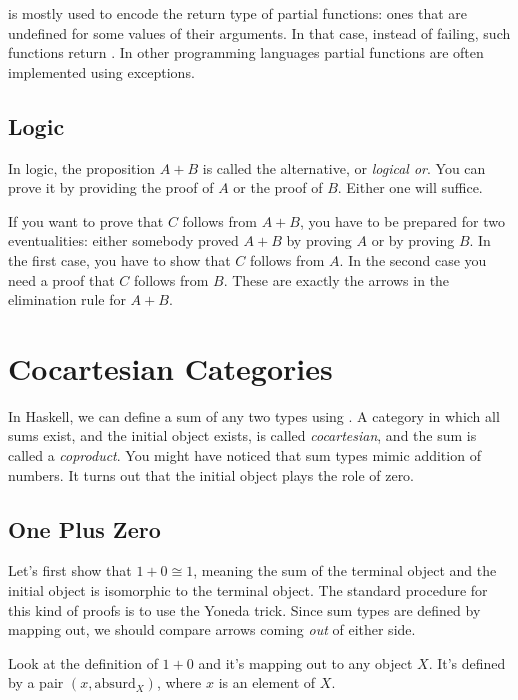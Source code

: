 \documentclass[DaoFP]{subfiles}
\begin{document}
 is mostly used to encode the return type of partial functions: ones that are undefined for some values of their arguments. In that case, instead of failing, such functions return . In other programming languages partial functions are often implemented using exceptions.

\subsection{Logic}

In logic, the proposition $A + B$ is called the alternative, or \emph{logical or}. You can prove it by providing the proof of $A$ or the proof of $B$. Either one will suffice. 

If you want to prove that $C$ follows from $A+B$, you have to be prepared for two eventualities: either somebody proved $A+B$ by proving $A$ or by proving $B$. In the first case, you have to show that $C$ follows from $A$. In the second case you need a proof that $C$ follows from $B$. These are exactly the arrows in the elimination rule for $A+B$.

\section{Cocartesian Categories}

In Haskell, we can define a sum of any two types using . A category in which all sums exist, and the initial object exists, is called \emph{cocartesian}, and the sum is called a \emph{coproduct}. You might have noticed that sum types mimic addition of numbers. It turns out that the initial object plays the role of zero. 



\subsection{One Plus Zero}
Let's first show that $1 + 0 \cong 1$, meaning the sum of the terminal object and the initial object is isomorphic to the terminal object. The standard procedure for this kind of proofs is to use the Yoneda trick. Since sum types are defined by mapping out, we should compare arrows coming \emph{out} of either side. 
 
Look at the definition of $1 + 0$ and it's mapping out to any object $X$. It's defined by a pair $(x, \text{absurd}_X)$, where $x$ is an element of $X$. 
\end{document}
